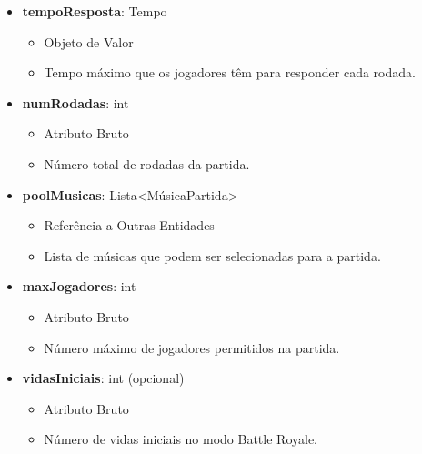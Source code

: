 \begin{itemize}
        \item \textbf{tempoResposta}: Tempo  
              \begin{itemize}
                  \item Objeto de Valor
                  \item Tempo máximo que os jogadores têm para responder cada rodada.
              \end{itemize}
    
        \item \textbf{numRodadas}: int  
              \begin{itemize}
                  \item Atributo Bruto
                  \item Número total de rodadas da partida.
              \end{itemize}
    
        \item \textbf{poolMusicas}: Lista\textless MúsicaPartida\textgreater  
              \begin{itemize}
                  \item Referência a Outras Entidades
                  \item Lista de músicas que podem ser selecionadas para a partida.
              \end{itemize}
    
        \item \textbf{maxJogadores}: int  
              \begin{itemize}
                  \item Atributo Bruto
                  \item Número máximo de jogadores permitidos na partida.
              \end{itemize}
    
        \item \textbf{vidasIniciais}: int (opcional)  
              \begin{itemize}
                  \item Atributo Bruto
                  \item Número de vidas iniciais no modo Battle Royale.
              \end{itemize}
    \end{itemize}
